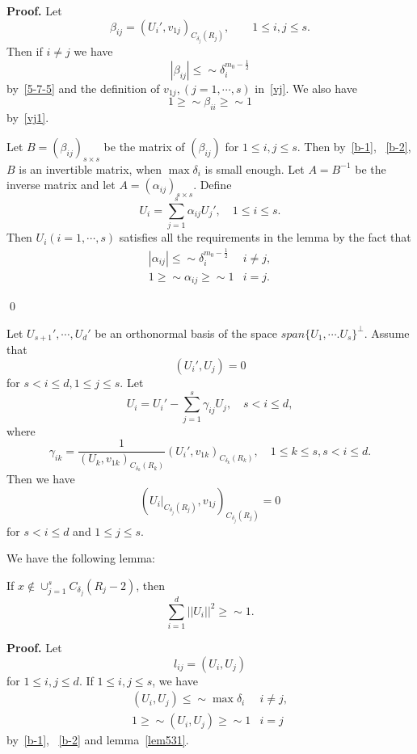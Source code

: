 {\bf Proof.} Let
\[
\beta_{ij}=(U_i',v_{1j})_{C_{\delta_j}(R_j)}, \qquad 1\leq i,j\leq s.
\]
Then if $i\neq j$ we have
\begin{equation}\label{b-1}
|\beta_{ij}|\leq\sim\delta_i^{m_0-\frac 12}
\end{equation}
by~\eqref{5-7-5} and the definition of $v_{1j},
(j=1,\cdots, s)$ in~\eqref{vj}. We also have
\begin{equation}\label{b-2}
1\geq\sim 
\beta_{ii}\geq\sim 1
\end{equation}
by~\eqref{vj1}. 

Let $B=(\beta_{ij})_{s\times s}$ be the matrix of $(\beta_{ij})$ for
$1\leq i,j\leq s$. Then   by~\eqref{b-1}, ~\eqref{b-2}, $B$  is an
invertible matrix,
when $\max\delta_i$ is small enough.
Let $A=B^{-1}$ be the
inverse matrix and let $A=(\alpha_{ij})_{s\times s}$. Define
\[
U_i=\sum_{j=1}^s\alpha_{ij}U_j', \quad 1\leq i\leq s.
\]
Then $U_i (i=1,\cdots, s)$ satisfies all the requirements in the lemma
by the fact that
\[
\begin{array}{ll}
|\alpha_{ij}|\leq\sim \delta_i^{m_0-\frac 12} & i\neq j,\\
1\geq\sim \alpha_{ij}\geq\sim 1 & i=j.
\end{array}
\]


\qed

Let $U_{s+1}',\cdots, U_d'$ be an orthonormal basis of the space 
$span\{ U_1,\cdots. U_s\}^\perp$. Assume that
\[
(U_i', U_j)=0
\]
for $s<i\leq d, 1\leq j\leq s$.
Let
\begin{equation}\label{kk}
U_i=U_i'-\sum_{j=1}^s\gamma_{ij}U_j,\quad s<i\leq d,
\end{equation}
where
\begin{equation}\label{b-3}
\gamma_{ik}=\frac{1}{(U_k, v_{1k})_{C_{\delta_k}(R_k)}}
(U_i', v_{1k})_{C_{\delta_k}(R_k)},
\quad 1\leq k\leq s, s<i\leq d.
\end{equation}
Then we have
\[
(U_i|_{C_{\delta_j}(R_j)}, v_{1j})_{C_{\delta_j}(R_j)}=0
\]
for $s<i\leq d$ and $1\leq j\leq s$.


We have the following lemma:









\begin{lemma}\label{lem53}
If $x\notin \cup_{j=1}^sC_{\delta_j}(R_j-2)$, then 
\[
\sum_{i=1}^d||U_i||^2\geq\sim 1.
\]
\end{lemma}


{\bf Proof.} Let
\[
l_{ij}=(U_i, U_j)
\]
for $1\leq i,j\leq d$. If $1\leq i,j\leq s$, we have
\begin{equation}\label{k1}
\begin{array}{ll}
(U_i, U_j)\leq\sim \max \delta_i & i\neq j,\\
1\geq\sim (U_i, U_j)\geq\sim  1 & i=j
\end{array}
\end{equation}
by~\eqref{b-1}, ~\eqref{b-2} and lemma~\ref{lem531}. 

